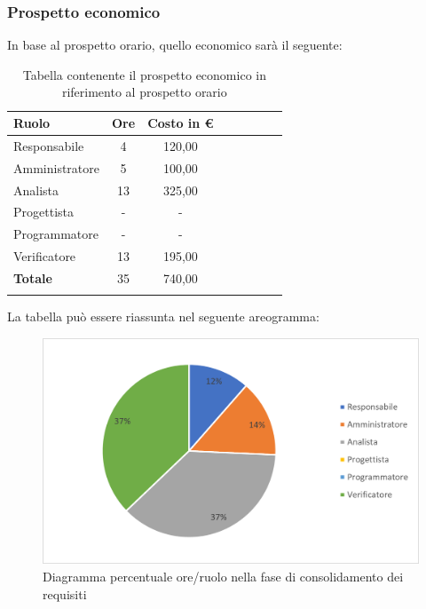 			\subsubsection{Prospetto economico}
			In base al prospetto orario, quello economico sarà il seguente: 
			
			\begin{longtable}{|l|c|c|c|c|c|c|c|}
				\hline
				\rowcolor{lighter-grayer}
				\textbf{Ruolo} & \textbf{Ore} & \textbf{Costo in €} \\
				\hline
				\endfirsthead
				
				\hline
				Responsabile & 4 & 120,00\\
				\hline
				\hline
				Amministratore & 5 & 100,00\\
				\hline
				\hline
				Analista & 13 & 325,00\\
				\hline
				\hline
				Progettista & - & -\\
				\hline
				\hline
				Programmatore & - & -\\
				\hline
				\hline
				Verificatore & 13 & 195,00\\
				\hline
				\hline
				\textbf{Totale} & 35 & 740,00\\
				\hline
				\rowcolor{white}
				\caption{Tabella contenente il prospetto economico in riferimento al prospetto orario}
			\end{longtable}
			\pagebreak
		
			La tabella può essere riassunta nel seguente areogramma:
			\begin{figure}[H]
				\centering
				\includegraphics[width=0.8\linewidth]{res/images/preventivo/2-2.png}
				\caption{Diagramma percentuale ore/ruolo nella fase di consolidamento dei requisiti}
				\label{fig:diagramma costi ruolo fase consolidamento dei requisiti}
            \end{figure}

